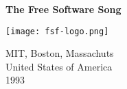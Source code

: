 \documentclass[projeto]{subfiles}
\begin{document}
\begin{titlepage}
	\begin{center}
		\vspace*{1cm}

		\Huge
		\textbf{The Free Software Song}

		\vspace{15cm}

		\texttt{[image: fsf-logo.png]}

		\normalsize
		MIT, Boston, Massachuts\\
		United States of America\\
		1993
	\end{center}
\end{titlepage}
\end{document}

